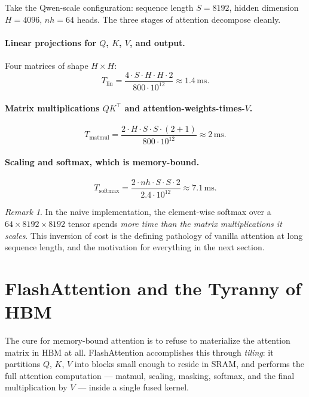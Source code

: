\documentclass[11pt,a4paper]{article}
\theoremstyle{definition}
\theoremstyle{remark}
\newtheorem{remark}[definition]{Remark}
\theoremstyle{plain}
\newcommand{\ms}{\,\text{ms}}
\begin{document}
Take the Qwen-scale configuration: sequence length $S=8192$, hidden dimension $H=4096$, $nh=64$ heads. The three stages of attention decompose cleanly.

\paragraph{Linear projections for $Q$, $K$, $V$, and output.} Four matrices of shape $H \times H$:
\begin{equation}
T_{\text{lin}} = \frac{4 \cdot S \cdot H \cdot H \cdot 2}{800 \cdot 10^{12}} \approx 1.4\ms.
\end{equation}

\paragraph{Matrix multiplications $Q K^{\!\top}$ and attention-weights-times-$V$.}
\begin{equation}
T_{\text{matmul}} = \frac{2 \cdot H \cdot S \cdot S \cdot (2{+}1)}{800 \cdot 10^{12}} \approx 2\ms.
\end{equation}

\paragraph{Scaling and softmax, which is memory-bound.}
\begin{equation}
T_{\text{softmax}} = \frac{2 \cdot nh \cdot S \cdot S \cdot 2}{2.4 \cdot 10^{12}} \approx 7.1\ms.
\end{equation}

\begin{remark}
In the naive implementation, the element-wise softmax over a $64 \times 8192 \times 8192$ tensor spends \emph{more time than the matrix multiplications it scales}. This inversion of cost is the defining pathology of vanilla attention at long sequence length, and the motivation for everything in the next section.
\end{remark}

\section{FlashAttention and the Tyranny of HBM}
\label{sec:flash}


The cure for memory-bound attention is to refuse to materialize the attention matrix in HBM at all. FlashAttention accomplishes this through \emph{tiling}: it partitions $Q$, $K$, $V$ into blocks small enough to reside in SRAM, and performs the full attention computation --- matmul, scaling, masking, softmax, and the final multiplication by $V$ --- inside a single fused kernel.
\end{document}
